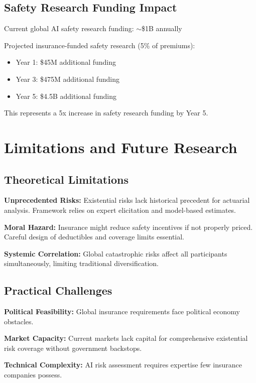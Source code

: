 \documentclass[11pt]{article}
\begin{document}
\subsection{Safety Research Funding Impact}

Current global AI safety research funding: $\sim$\$1B annually

Projected insurance-funded safety research (5\% of premiums):
\begin{itemize}
   \item Year 1: \$45M additional funding
   \item Year 3: \$475M additional funding  
   \item Year 5: \$4.5B additional funding
\end{itemize}

This represents a 5x increase in safety research funding by Year 5.

\section{Limitations and Future Research}

\subsection{Theoretical Limitations}

\textbf{Unprecedented Risks:} Existential risks lack historical precedent for actuarial analysis. Framework relies on expert elicitation and model-based estimates.

\textbf{Moral Hazard:} Insurance might reduce safety incentives if not properly priced. Careful design of deductibles and coverage limits essential.

\textbf{Systemic Correlation:} Global catastrophic risks affect all participants simultaneously, limiting traditional diversification.

\subsection{Practical Challenges}

\textbf{Political Feasibility:} Global insurance requirements face political economy obstacles.

\textbf{Market Capacity:} Current markets lack capital for comprehensive existential risk coverage without government backstops.

\textbf{Technical Complexity:} AI risk assessment requires expertise few insurance companies possess.
\end{document}
